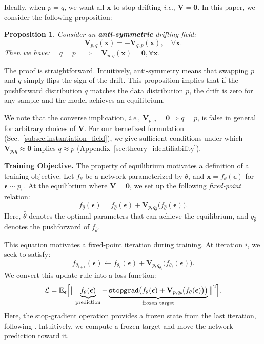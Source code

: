 \documentclass{article}
\newcommand{\vv}[1]{\mathbf{#1}}
\newcommand{\x}{\vv{x}}
\newcommand{\V}{\vv{V}}
\newcommand{\e}{{\boldsymbol{\epsilon}}}
\newcommand{\otheta}{{\hat{\theta}}}
\renewcommand{\paragraph}[1]{\vspace{.05em}\noindent\textbf{#1}}
\def\onedot{.}
\def\ie{\emph{i.e}\onedot} \def\Ie{\emph{I.e}\onedot}
\theoremstyle{plain}
\newtheorem{proposition}[theorem]{Proposition}
\theoremstyle{definition}
\theoremstyle{remark}
\begin{document}
Ideally, when $p=q$, we want all $\x$ to stop drifting \ie, $\V=\textbf{0}$.
In this paper, we consider the following proposition:
\begin{proposition}
Consider an \textbf{anti-symmetric} drifting field:
\begin{equation}
\label{eq:asym}
\V_{p,q}(\x) = - \V_{q,p}(\x),\quad \forall \x.
\end{equation}
Then we have: $\quad q=p \quad \Rightarrow \quad \V_{p,q}(\x) = \mathbf{0},\forall \x$.
\end{proposition}

The proof is straightforward\footnotemark.
Intuitively, anti-symmetry means that swapping $p$ and $q$ simply flips the sign of the drift.
This proposition implies that if the pushforward distribution $q$ matches the data distribution $p$, the drift is zero for any sample and the model achieves an equilibrium.

\footnotetext{$q{=}p \Rightarrow \V_{p,q}{=}\V_{q,p}{=}{-}\V_{p,q} \Rightarrow \V_{p,q}{=}\textbf{0}$}

We note that the converse implication, \ie, $\V_{p,q}=\mathbf{0}\Rightarrow q=p$, is false in general for arbitrary choices of $\V$.
For our kernelized formulation (Sec.~\ref{subsec:instantiation_field}), we give sufficient conditions under which $\V_{p,q}\approx\mathbf{0}$ implies $q\approx p$ (Appendix~\ref{sec:theory_identifiability}).



\paragraph{Training Objective.}
The property of equilibrium motivates a definition of a training objective.
Let $f_\theta$ be a network parameterized by $\theta$, and $\x = f_\theta(\e)$ for $\e \sim p_\e$. At the equilibrium where $\V=\textbf{0}$, we set up the following \textit{fixed-point} relation:
\begin{equation}
\label{eq:eq_cond}
f_{\otheta}(\e)
=
f_{\otheta}(\e)
+
\V_{p,q_{\otheta}}\!\big(f_{\otheta}(\e)\big).
\end{equation}
Here, $\otheta$ denotes the optimal parameters that can achieve the equilibrium, and $q_\otheta$ denotes the pushforward of $f_{\otheta}$.

This equation motivates a fixed-point iteration during training. At iteration $i$, we seek to satisfy:
\begin{equation}
f_{\theta_{i+1}}(\e)
\leftarrow
f_{\theta_{i}}(\e)
+
\V_{p,q_{\theta_{i}}}\!\big(f_{\theta_{i}}(\e)\big).
\end{equation}
We convert this update rule into a loss function:
\begin{equation}
\label{eq:train_loss}
\mathcal{L}
=
\mathbb{E}_{\e}
\Big[
\big\|
\underbrace{f_{\theta}(\e)}_{\text{prediction}}
-
\underbrace{
\text{\texttt{stopgrad}}\big(
f_{\theta}(\e)
+
\V_{p,q_{\theta}}\!\big(f_{\theta}(\e)\big)
\big)
}_{\text{frozen target}}
\big\|^2
\Big].
\end{equation}
Here, the stop-gradient operation provides a frozen state from the last iteration, following \cite{chen2021exploring,song2023improved}.
Intuitively, we compute a frozen target and move the network prediction toward it.
\end{document}
